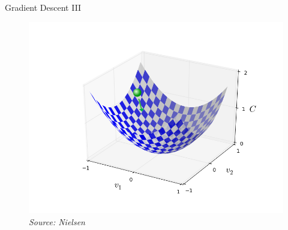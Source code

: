 \documentclass[xcolor=dvipsnames, fontsize=11pt, %
pagesize, %
parskip=half-, t]{beamer}
\begin{document}
 \begin{frame}[c]{Gradient Descent III}
 \begin{figure}[H] \center
 \includegraphics[scale=0.32]{valley_with_ball.png}
 \caption{\textit{Source: Nielsen}}
 \end{figure}
 
 \end{frame}
\end{document}

